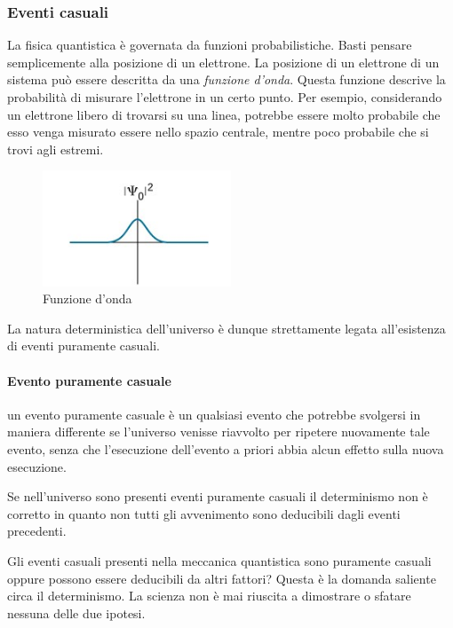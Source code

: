 \documentclass{article}
\begin{document}
\subsubsection{Eventi casuali}

La fisica quantistica è governata da funzioni probabilistiche.
Basti pensare semplicemente alla posizione di un elettrone. La posizione di un elettrone
di un sistema può essere descritta da una \textit{funzione d'onda}. Questa funzione descrive
la probabilità di misurare l'elettrone in un certo punto. Per esempio, considerando un elettrone libero
di trovarsi su una linea, potrebbe essere molto probabile che esso venga misurato essere nello spazio centrale, mentre
poco probabile che si trovi agli estremi.

\begin{figure}[h]
    \centering
    \includegraphics[width=0.5\textwidth]{wavefunction.jpg}
    \caption{Funzione d'onda}
\end{figure}

La natura deterministica dell'universo è dunque strettamente legata all'esistenza di
eventi puramente casuali.

\paragraph{Evento puramente casuale} un evento puramente casuale è un qualsiasi evento che potrebbe svolgersi in maniera differente se l'universo venisse riavvolto per ripetere nuovamente tale evento, senza che l'esecuzione dell'evento a priori abbia alcun effetto sulla nuova esecuzione.

Se nell'universo sono presenti eventi puramente casuali il determinismo non è corretto
in quanto non tutti gli avvenimento sono deducibili dagli eventi precedenti.

Gli eventi casuali presenti nella meccanica quantistica sono puramente casuali
oppure possono essere deducibili da altri fattori?
Questa è la domanda saliente circa il determinismo. La scienza non è mai riuscita a dimostrare
o sfatare nessuna delle due ipotesi.
\end{document}
